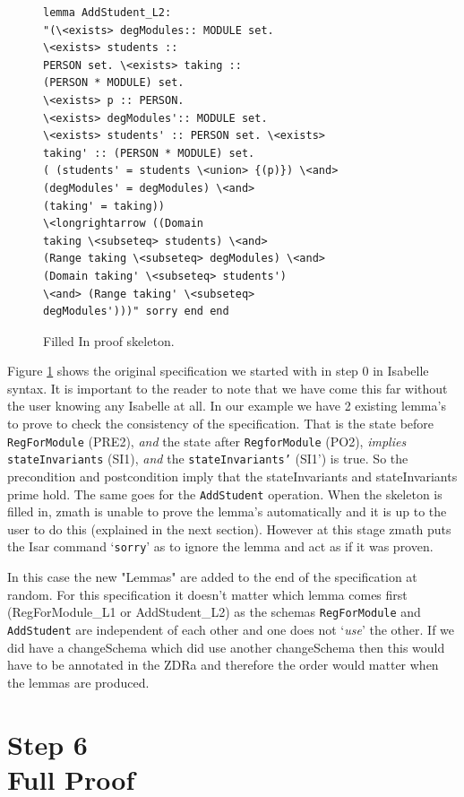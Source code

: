 \begin{figure}[H]
\begin{minipage}{0.45\textwidth}
\begin{scriptsize}
\begin{BVerbatim}
lemma AddStudent_L2: 
"(\<exists> degModules:: MODULE set. 
\<exists> students ::
PERSON set. \<exists> taking :: 
(PERSON * MODULE) set. 
\<exists> p :: PERSON.
\<exists> degModules':: MODULE set. 
\<exists> students' :: PERSON set. \<exists>
taking' :: (PERSON * MODULE) set. 
( (students' = students \<union> {(p)}) \<and>
(degModules' = degModules) \<and> 
(taking' = taking)) 
\<longrightarrow ((Domain
taking \<subseteq> students) \<and> 
(Range taking \<subseteq> degModules) \<and>
(Domain taking' \<subseteq> students') 
\<and> (Range taking' \<subseteq>
degModules')))" sorry end end
\end{BVerbatim}
\end{scriptsize}
\end{minipage}
\caption{Filled In proof skeleton. \label{fig:fillinFullexample}}
\end{figure}

Figure \ref{fig:fillinFullexample} shows the original specification we started
with in step 0 in Isabelle syntax. It is important to the reader to note that we
have come this far without the user knowing any Isabelle at all. In our example
we have 2 existing lemma's to prove to check the consistency of the
specification. That is the state before \texttt{RegForModule} (PRE2), \emph{and}
the state after \texttt{RegforModule} (PO2), \emph{implies}
\texttt{stateInvariants} (SI1), \emph{and} the \texttt{stateInvariants'} (SI1')
is true. So the precondition and postcondition imply that the stateInvariants
and stateInvariants prime hold. The same goes for the \texttt{AddStudent}
operation. When the skeleton is filled in, \gls{zmath} is unable to prove the
lemma's automatically and it is up to the user to do this (explained in the next
section). However at this stage \gls{zmath} puts the Isar command
`\texttt{sorry}' as to ignore the lemma and act as if it was proven.

In this case the new "Lemmas" are added to the end of the specification at random.
For this specification it doesn't matter which lemma comes first (RegForModule\_L1 or AddStudent\_L2)
as the schemas \texttt{RegForModule} and \texttt{AddStudent} are independent of
each other
and one does not `\textit{use}' the other. If we did have a changeSchema which did use another changeSchema
then this would have to be annotated in the ZDRa and therefore the order would matter when the lemmas are produced.


\section{Step 6\\Full Proof}

